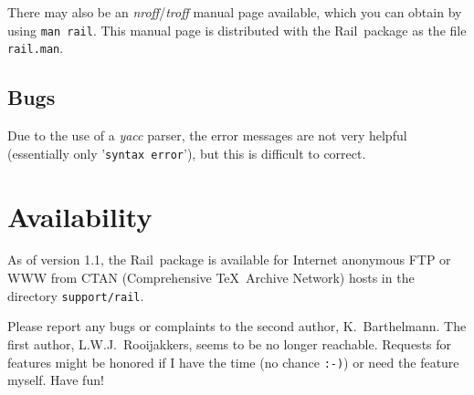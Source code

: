 \documentclass[a4paper]{article}
\newcommand\Rail{Rail}
\newcommand\lit[1]{\texttt{#1}}
\begin{document}
There may also be an \textit{nroff}/\textit{troff} manual page available,
which you can obtain by using \verb!man rail!. This manual page is
distributed with the \Rail\ package as the file \verb!rail.man!.

\subsection{Bugs}

Due to the use of a \textit{yacc} parser, the error messages are not very
helpful (essentially only '\lit{syntax error}'), but this is difficult
to correct.

\section{Availability}

As of version 1.1, the \Rail\ package is available for Internet anonymous FTP
or WWW from CTAN (Comprehensive \TeX\ Archive Network) hosts in the directory
\lit{support/rail}.

Please report any bugs or complaints to the second author, K.~Barthelmann. The
first author, L.W.J.~Rooijakkers, seems to be no longer reachable. Requests for
features might be honored if I have the time (no chance \lit{:-)}) or need the
feature myself. Have fun!
\end{document}
